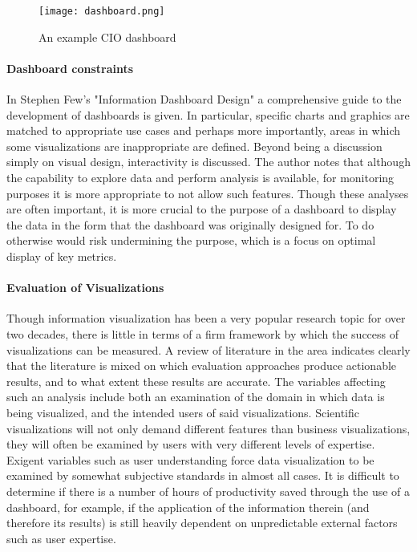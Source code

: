 \begin{figure}
	\centering
	\texttt{[image: dashboard.png]}
	\caption{An example CIO dashboard \cite{Few2006}}
	\label{fig:dashboard}
\end{figure}

\paragraph{Dashboard constraints}
In Stephen Few's "Information Dashboard Design" \cite{Few2006} a comprehensive guide to the development of dashboards is given. In particular, specific charts and graphics are matched to appropriate use cases and perhaps more importantly, areas in which some visualizations are inappropriate are defined. Beyond being a discussion simply on visual design, interactivity is discussed. The author notes that although the capability to explore data and perform analysis is available, for monitoring purposes it is more appropriate to not allow such features. Though these analyses are often important, it is more crucial to the purpose of a dashboard to display the data in the form that the dashboard was originally designed for. To do otherwise would risk undermining the purpose, which is a focus on optimal display of key metrics.

\paragraph{Evaluation of Visualizations}
Though information visualization has been a very popular research topic for over two decades, there is little in terms of a firm framework by which the success of visualizations can be measured. A review of literature in the area \cite{Amende2010} indicates clearly that the literature is mixed on which evaluation approaches produce actionable results, and to what extent these results are accurate. The variables affecting such an analysis include both an examination of the domain in which data is being visualized, and the intended users of said visualizations. Scientific visualizations will not only demand different features than business visualizations, they will often be examined by users with very different levels of expertise. Exigent variables such as user understanding force data visualization to be examined by somewhat subjective standards in almost all cases. It is difficult to determine if there is a number of hours of productivity saved through the use of a dashboard, for example, if the application of the information therein (and therefore its results) is still heavily dependent on unpredictable external factors such as user expertise. 


